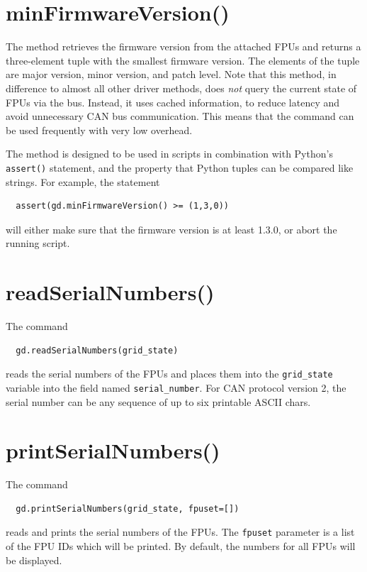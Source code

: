 \documentclass[fontsize=12,a4paper]{scrreprt}
\begin{document}
\section{minFirmwareVersion()}
\label{sec:minfirmwareversion}
    The method retrieves
the firmware version from the attached FPUs and returns a
three-element tuple with the smallest firmware version.  The elements
of the tuple are major version, minor version, and patch level. Note
that this method, in difference to almost all other driver methods,
does \emph{not} query the current state of FPUs via the bus. Instead,
it uses cached information, to reduce latency and avoid unnecessary
CAN bus communication. This means that the command can be used
frequently with very low overhead.


The method is designed to be used in scripts in combination with
Python's \texttt{assert()} statement, and the property that Python
tuples can be compared like strings. For example, the statement
\begin{verbatim}
  assert(gd.minFirmwareVersion() >= (1,3,0))
\end{verbatim}
will either make sure that the firmware version is at least 1.3.0, or
abort the running script.

\section{readSerialNumbers()}

The command
\begin{verbatim}
  gd.readSerialNumbers(grid_state)
\end{verbatim}
reads the serial numbers of the FPUs and places them into the
\texttt{grid\_state} variable into the field named
\texttt{serial\_number}. For CAN protocol version 2, the serial number
can be any sequence of up to six printable ASCII chars.


\section{printSerialNumbers()}

The command
\begin{verbatim}
  gd.printSerialNumbers(grid_state, fpuset=[])
\end{verbatim}
reads and prints the serial numbers of the FPUs.  The \texttt{fpuset}
parameter is a list of the FPU IDs which will be printed. By default,
the numbers for all FPUs will be displayed.
\end{document}
